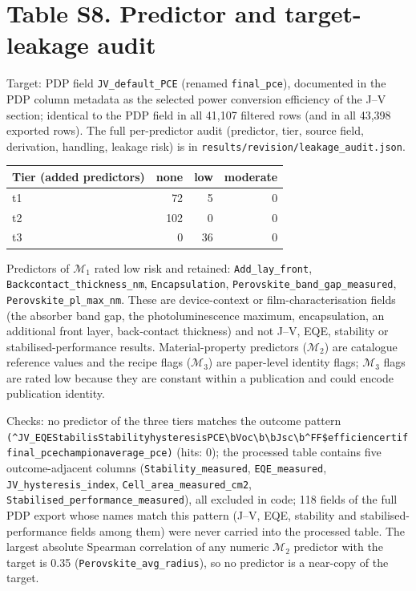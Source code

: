 \documentclass[10pt]{article}
\begin{document}
\section*{Table S8. Predictor and target-leakage audit}
Target: PDP field \texttt{JV\_default\_PCE} (renamed \texttt{final\_pce}), documented in the PDP column metadata as the selected power conversion efficiency of the J--V section; identical to the PDP field in all 41,107 filtered rows (and in all 43,398 exported rows). The full per-predictor audit (predictor, tier, source field, derivation, handling, leakage risk) is in \texttt{results/revision/leakage\_audit.json}.\par
\begin{tabular}{lrrr}\toprule Tier (added predictors) & none & low & moderate\\\midrule
t1 & 72 & 5 & 0\\
t2 & 102 & 0 & 0\\
t3 & 0 & 36 & 0\\
\bottomrule\end{tabular}\par\smallskip
Predictors of $\mathcal{M}_1$ rated low risk and retained: \texttt{Add\_lay\_front}, \texttt{Backcontact\_thickness\_nm}, \texttt{Encapsulation}, \texttt{Perovskite\_band\_gap\_measured}, \texttt{Perovskite\_pl\_max\_nm}. These are device-context or film-characterisation fields (the absorber band gap, the photoluminescence maximum, encapsulation, an additional front layer, back-contact thickness) and not J--V, EQE, stability or stabilised-performance results. Material-property predictors ($\mathcal{M}_2$) are catalogue reference values and the recipe flags ($\mathcal{M}_3$) are paper-level identity flags; $\mathcal{M}_3$ flags are rated low because they are constant within a publication and could encode publication identity.\par
Checks: no predictor of the three tiers matches the outcome pattern \texttt{(\^{}JV\_\textbar{}\allowbreak EQE\textbar{}\allowbreak Stabilis\textbar{}\allowbreak Stability\textbar{}\allowbreak hysteresis\textbar{}\allowbreak PCE\textbar{}\allowbreak \textbackslash{}bVoc\textbackslash{}b\textbar{}\allowbreak \textbackslash{}bJsc\textbackslash{}b\textbar{}\allowbreak \^{}FF\$\textbar{}\allowbreak efficien\textbar{}\allowbreak certif\textbar{}\allowbreak final\_pce\textbar{}\allowbreak champion\textbar{}\allowbreak average\_pce)} (hits: 0); the processed table contains five outcome-adjacent columns (\texttt{Stability\_measured}, \texttt{EQE\_measured}, \texttt{JV\_hysteresis\_index}, \texttt{Cell\_area\_measured\_cm2}, \texttt{Stabilised\_performance\_measured}), all excluded in code; 118 fields of the full PDP export whose names match this pattern (J--V, EQE, stability and stabilised-performance fields among them) were never carried into the processed table. The largest absolute Spearman correlation of any numeric $\mathcal{M}_2$ predictor with the target is 0.35 (\texttt{Perovskite\_avg\_radius}), so no predictor is a near-copy of the target.\par
\end{document}

